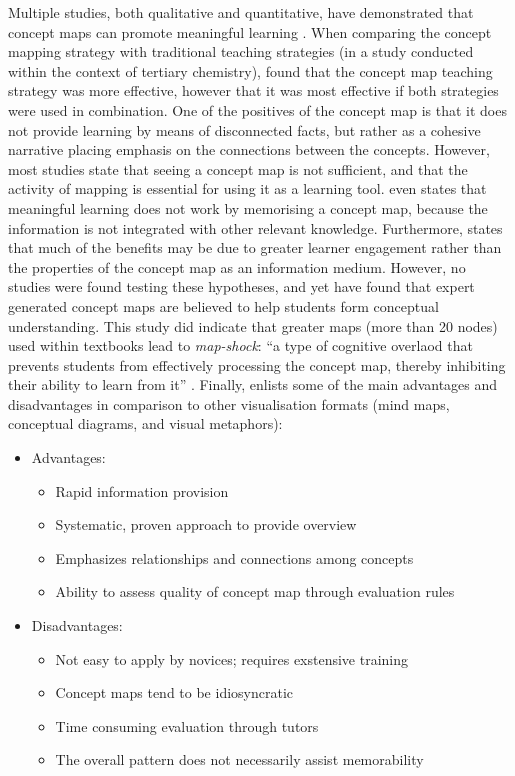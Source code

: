 Multiple studies, both qualitative and quantitative, have demonstrated that concept maps can promote meaningful learning \cite{canas, hwang2, nesbit2, subramaniam}. When comparing the concept mapping strategy with traditional teaching strategies (in a study conducted within the context of tertiary chemistry),  found that the concept map teaching strategy was more effective, however that it was most effective if both strategies were used in combination. One of the positives of the concept map is that it does not provide learning by means of disconnected facts, but rather as a cohesive narrative placing emphasis on the connections between the concepts. However, most studies state that seeing a concept map is not sufficient, and that the activity of mapping is essential for using it as a learning tool.  even states that meaningful learning does not work by memorising a concept map, because the information is not integrated with other relevant knowledge. Furthermore,  states that much of the benefits may be due to greater learner engagement rather than the properties of the concept map as an information medium. However, no studies were found testing these hypotheses, and yet  have found that expert generated concept maps are believed to help students form conceptual understanding. This study did indicate that greater maps (more than 20 nodes) used within textbooks lead to \emph{map-shock}: ``a type of cognitive overlaod that prevents students from effectively processing the concept map, thereby inhibiting their ability to learn from it'' \cite[p.~3]{moore}. Finally,  enlists some of the main advantages and disadvantages in comparison to other visualisation formats (mind maps, conceptual diagrams, and visual metaphors):

\begin{itemize}
    \item Advantages:
        \begin{itemize}
            \item Rapid information provision
            \item Systematic, proven approach to provide overview
            \item Emphasizes relationships and connections among concepts
            \item Ability to assess quality of concept map through evaluation rules
        \end{itemize}
    \item Disadvantages:
        \begin{itemize}
            \item Not easy to apply by novices; requires exstensive training
            \item Concept maps tend to be idiosyncratic
            \item Time consuming evaluation through tutors
            \item The overall pattern does not necessarily assist memorability
        \end{itemize}
\end{itemize}

